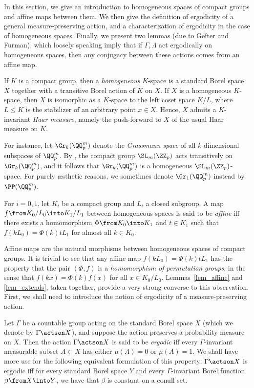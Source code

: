\documentclass[oneside,leqno,11pt]{amsart}
\begin{document}
In this section, we give an introduction to homogeneous spaces of
compact groups and affine maps between them.  We then give the
definition of ergodicity of a general measure-preserving action, and a
characterization of ergodicity in the case of homogeneous spaces.
Finally, we present two lemmas (due to Gefter and Furman), which
loosely speaking imply that if $\Gamma,\Lambda$ act ergodically on
homogeneous spaces, then any conjugacy between these actions comes
from an affine map.

If $K$ is a compact group, then a \emph{homogeneous} $K$-space is a
standard Borel space $X$ together with a transitive Borel action of
$K$ on $X$.  If $X$ is a homogeneous $K$-space, then $X$ is isomorphic
as a $K$-space to the left coset space $K/L$, where $L\leq K$ is the
stabilizer of an arbitrary point $x\in X$.  Hence, $X$ admits a
$K$-invariant \emph{Haar measure}, namely the push-forward to $X$ of
the usual Haar measure on $K$.

For instance, let $\Gr_k(\QQ_p^m)$ denote the \emph{Grassmann space}
of all $k$-dimensional subspaces of $\QQ_p^m$.  By
\cite[Proposition~6.1]{super}, the compact group $\SL_m(\ZZ_p)$ acts
transitively on $\Gr_k(\QQ_p^m)$, and it follows that $\Gr_k(\QQ_p^m)$
is a homogeneous $\SL_m(\ZZ_p)$-space.  For purely \ae sthetic
reasons, we sometimes denote $\Gr_1(\QQ_p^m)$ instead by
$\PP(\QQ_p^m)$.

\begin{defn}
  For $i=0,1$, let $K_i$ be a compact group and $L_i$ a closed
  subgroup.  A map $f\from K_0/L_0\into K_1/L_1$ between homogeneous
  spaces is said to be \emph{affine} iff there exists a homomorphism
  $\Phi\from K_0\into K_1$ and $t\in K_1$ such that
  $f(kL_0)=\Phi(k)tL_1$ for almost all $k\in K_0$.
\end{defn}

Affine maps are the natural morphisms between homogeneous spaces of
compact groups.  It is trivial to see that any affine map
$f(kL_0)=\Phi(k)tL_1$ has the property that the pair $(\Phi,f)$ is a
\emph{homomorphism of permutation groups}, in the sense that
$f(kx)=\Phi(k)f(x)$ for all $x\in K_0/L_0$.  Lemmas~\ref{lem_affine}
and \ref{lem_extends}, taken together, provide a very strong converse
to this observation.  First, we shall need to introduce the notion of
ergodicity of a measure-preserving action.

Let $\Gamma$ be a countable group acting on the standard Borel space
$X$ (which we denote by $\Gamma\actson X$), and suppose the action
preserves a probability measure on $X$.  Then the action
$\Gamma\actson X$ is said to be \emph{ergodic} iff every
$\Gamma$-invariant measurable subset $A\subset X$ has either
$\mu(A)=0$ or $\mu(A)=1$.  We shall have more use for the following
equivalent formulation of this property: $\Gamma\actson X$ is ergodic
iff for every standard Borel space $Y$ and every $\Gamma$-invariant
Borel function $\beta\from X\into Y$, we have that $\beta$ is
constant on a conull set.
\end{document}
